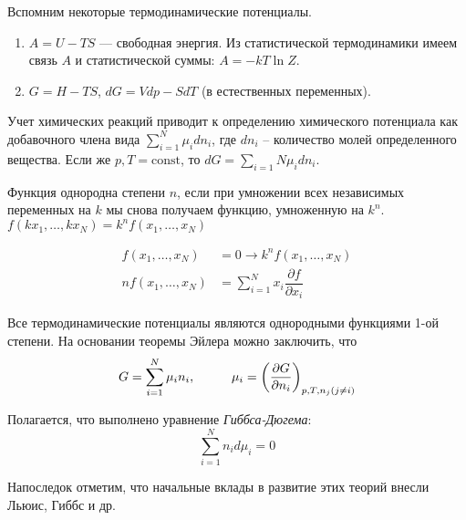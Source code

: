\begin{lecture}
    Вспомним некоторые термодинамические потенциалы.
    \begin{enumerate}
    	\item $A = U - TS$ --- свободная энергия. Из статистической термодинамики имеем связь $A$ и статистической суммы: $ A = -kT \ln Z $. 
    	\item $ G = H - TS $, $ dG = Vdp - SdT $ (в естественных переменных).
    \end{enumerate}

	Учет химических реакций приводит к определению химического потенциала как добавочного члена вида $ \sum\limits_{i=1}^{N} \mu_i dn_i $, где $ dn_i $ -- количество молей определенного вещества. Если же $ p, T = \text{const} $, то $ dG = \sum\limits_{i=1}{N} \mu_i dn_i $.
	
	\begin{definition}
		Функция однородна степени $n$, если при умножении всех независимых переменных на $k$ мы снова получаем функцию, умноженную на $k^n$. \\
		$ f( kx_1, \dots, kx_N ) = k^n f( x_1, \dots, x_N ) $
	\end{definition}
	
	\begin{theorem}
		\begin{align}
			f( x_1, \dots, x_N ) &= 0 \rightarrow  k^n f( x_1, \dots, x_N ) \\
			n f( x_1, \dots, x_N ) &= \sum\limits_{i=1}^{N} x_i \dfrac{\partial f}{\partial x_i}
		\end{align}
	\end{theorem}
    
    
    Все термодинамические потенциалы являются однородными функциями 1-ой степени. На основании теоремы Эйлера можно заключить, что
    \begin{equation}
	    \begin{aligned}
    		G = \sum\limits_{i=1}^{N} \mu_i n_i, \hspace*{1cm} \mu_i = \left( \dfrac{\partial G}{\partial n_i} \right)_{p, T, n_j (j \neq i)}
	    \end{aligned}
	    \label{eq:G_eiler_combo}
    \end{equation}
    
    Полагается, что выполнено уравнение \textit{Гиббса-Дюгема}: 
    \begin{equation}
		\sum\limits_{i=1}^{N} n_i d\mu_i = 0
		\label{eq:gibbs_dugem}
    \end{equation}
    
    Напоследок отметим, что начальные вклады в развитие этих теорий внесли Льюис, Гиббс и др.
\end{lecture}
